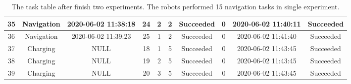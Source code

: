 \begin{table}
{\begin{tabular}{|c|c|c|c|c|c|c|c|c|c|}
35 & Navigation & 2020-06-02 11:38:18 & 24 & 2 & 2 & Succeeded & 0 & 2020-06-02 11:40:11 & Succeeded \\ \hline
36 & Navigation & 2020-06-02 11:39:23 & 25 & 1 & 2 & Succeeded & 0 & 2020-06-02 11:41:40 & Succeeded \\ \hline
37 & Charging & NULL & 18 & 1 & 5 & Succeeded & 0 & 2020-06-02 11:43:45 & Succeeded \\ \hline
38 & Charging & NULL & 19 & 2 & 5 & Succeeded & 0 & 2020-06-02 11:43:45 & Succeeded \\ \hline
39 & Charging & NULL & 20 & 3 & 5 & Succeeded & 0 & 2020-06-02 11:43:45 & Succeeded \\ \hline
\end{tabular}}
\caption{The task table after finish two experiments. The robots performed 15 navigation tasks in single experiment.}
\label{tab:exp_task_table}
\end{table}






